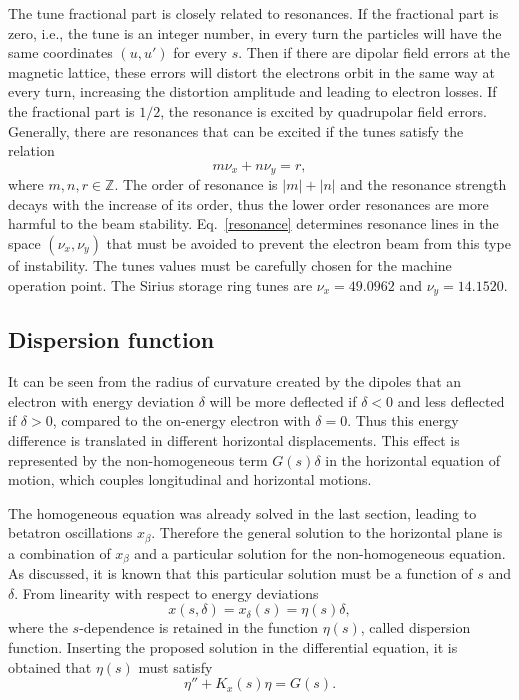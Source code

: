 The tune fractional part is closely related to resonances. If the fractional part is zero, i.e., the tune is an integer number, in every turn the particles will have the same coordinates $(u, u')$ for every $s$. Then if there are dipolar field errors at the magnetic lattice, these errors will distort the electrons orbit in the same way at every turn, increasing the distortion amplitude and leading to electron losses. If the fractional part is $1/2$, the resonance is excited by quadrupolar field errors. Generally, there are resonances that can be excited if the tunes satisfy the relation
\begin{equation}
    m \nu_x + n \nu_y = r,
    \label{resonance}
\end{equation}
where $m, n, r \in \mathbb{Z}$. The order of resonance is $|m| + |n|$ and the resonance strength decays with the increase of its order, thus the lower order resonances are more harmful to the beam stability. Eq.~\eqref{resonance} determines resonance lines in the space $(\nu_x, \nu_y)$ that must be avoided to prevent the electron beam from this type of instability. The tunes values must be carefully chosen for the machine operation point. The Sirius storage ring tunes are $\nu_x = 49.0962$ and $\nu_y=14.1520$.
\subsection{Dispersion function}
It can be seen from the radius of curvature created by the dipoles that an electron with energy deviation $\delta$ will be more deflected if $\delta < 0$ and less deflected if $\delta > 0$, compared to the on-energy electron with $\delta = 0$. Thus this energy difference is translated in different horizontal displacements. This effect is represented by the non-homogeneous term $G(s)\delta$ in the horizontal equation of motion, which couples longitudinal and horizontal motions.

The homogeneous equation was already solved in the last section, leading to betatron oscillations $x_{\beta}$. Therefore the general solution to the horizontal plane is a combination of $x_{\beta}$ and a particular solution for the non-homogeneous equation. As discussed, it is known that this particular solution must be a function of $s$ and $\delta$. From linearity with respect to energy deviations
\begin{equation}
    x(s, \delta) = x_{\delta}(s) = \eta(s) \delta,
\end{equation}
where the $s$-dependence is retained in the function $\eta(s)$, called dispersion function. Inserting the proposed solution in the differential equation, it is obtained that $\eta(s)$ must satisfy
\begin{equation}
    \eta'' + K_x(s)\eta = G(s).
    \label{eq:dispersion}
\end{equation}

